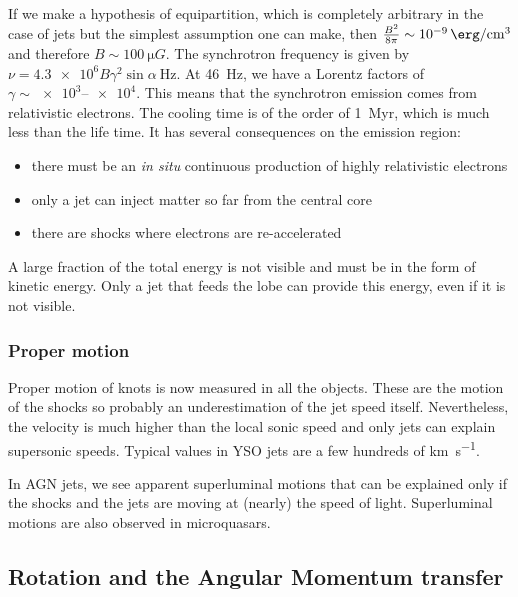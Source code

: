 \documentclass[10pt,a4paper,english]{article}
\begin{document}
If we make a hypothesis of equipartition, which is completely arbitrary in the
case of jets but the simplest assumption one can make, then $\frac{B^2}{8\pi}
\sim \SI{e-9}{\erg\per\cm\cubed}$ and therefore $B \sim \SI{100}{\micro G}$.
The synchrotron frequency is given by $\nu = \num{4.3e6} B\gamma^2 \sin\alpha\
\si{\Hz}$. At \SI{46}{Hz}, we have a Lorentz factors of $\gamma \sim
\numrange{e3}{e4}$. This means that the synchrotron emission comes from
relativistic electrons. The cooling time is of the order of \SI{1}{Myr}, which
is much less than the life time. It has several consequences on the emission
region:
\begin{itemize}
    \item there must be an \emph{in situ} continuous production of highly
          relativistic electrons
    \item only a jet can inject matter so far from the central core
    \item there are shocks where electrons are re-accelerated
\end{itemize}

A large fraction of the total energy is not visible and must be in the form of
kinetic energy. Only a jet that feeds the lobe can provide this energy, even if
it is not visible.

\subsubsection{Proper motion}

Proper motion of knots is now measured in all the objects. These are the motion
of the shocks so probably an underestimation of the jet speed itself.
Nevertheless, the velocity is much higher than the local sonic speed and only
jets can explain supersonic speeds. Typical values in YSO jets are a few
hundreds of \si{\km\per\s}.


In AGN jets, we see apparent superluminal motions that can be explained only if
the shocks and the jets are moving at (nearly) the speed of light. Superluminal
motions are also observed in microquasars.


\subsection{Rotation and the Angular Momentum transfer}
\end{document}
